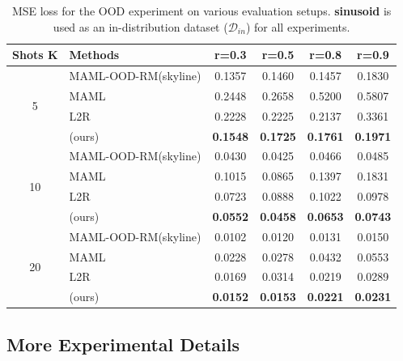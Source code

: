 \begin{table}[!htbp]
\small
    \centering
\begin{tabular}{c|l|c|c|c|c}
    \toprule
    Shots K & Methods & r=0.3 & r=0.5 & r=0.8 & r=0.9   \\
    \midrule
    \multirow{4}{*}{5} & MAML-OOD-RM(skyline)  & 0.1357 & 0.1460 & 0.1457 & 0.1830 \\
    \cline{2-6} 
    & MAML  & 0.2448  & 0.2658 & 0.5200 & 0.5807 \\
    & L2R   & 0.2228  & 0.2225 & 0.2137 & 0.3361 \\
    & \sysname{} (ours)  & \textbf{0.1548} & \textbf{0.1725} & \textbf{0.1761} & \textbf{0.1971} \\
    \midrule
    \multirow{4}{*}{10} & MAML-OOD-RM(skyline)  & 0.0430 & 0.0425 & 0.0466 & 0.0485 \\
    \cline{2-6} 
    & MAML  & 0.1015 & 0.0865 & 0.1397 &  0.1831 \\
    & L2R   & 0.0723 & 0.0888 & 0.1022 &  0.0978 \\
    & \sysname{} (ours)  & \textbf{0.0552} & \textbf{0.0458} & \textbf{0.0653} & \textbf{0.0743} \\
    \midrule
    \multirow{4}{*}{20} & MAML-OOD-RM(skyline)  & 0.0102 & 0.0120  & 0.0131 & 0.0150 \\
    \cline{2-6} 
    & MAML  & 0.0228 &  0.0278  & 0.0432 & 0.0553 \\
    & L2R   & 0.0169 &  0.0314  & 0.0219 & 0.0289 \\
    & \sysname{} (ours)  &  \textbf{0.0152} & \textbf{0.0153} & \textbf{0.0221} & \textbf{0.0231} \\
    \bottomrule
\end{tabular}
\caption{MSE loss for the OOD experiment on various evaluation setups. \textbf{sinusoid} is used as an in-distribution dataset ($\mathcal{D}_{in}$) for all experiments. }
\label{tab:regres}

\end{table}

\subsection{More Experimental Details} \label{app:exp_details}

